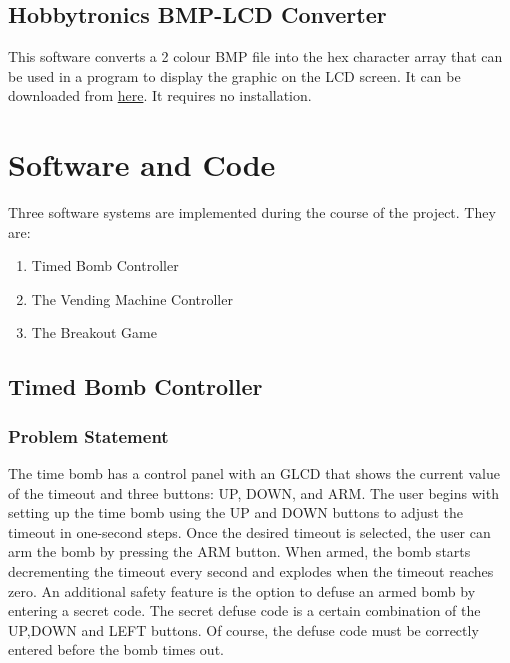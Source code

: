 \documentclass[a4paper,12pt,oneside]{book}
\begin{document}
\section{Hobbytronics BMP-LCD Converter}
\qquad This software converts a 2 colour BMP file into the hex character array that can be used in a program to display the graphic on the LCD screen. It can be downloaded from
\href{http://www.hobbytronics.co.uk/download/BMP-LCD.zip}{here}. It requires no installation.

\chapter{Software and Code}
Three software systems are implemented during the course of the project. They are:
\begin{enumerate}
\item Timed Bomb Controller
\item The Vending Machine Controller
\item The Breakout Game
\end{enumerate}

\section{Timed Bomb Controller}
\subsection{Problem Statement}
\qquad The time bomb has a control panel with an GLCD that shows the current value of the timeout and three buttons: UP, DOWN, and ARM. The user begins with setting up the time bomb using the UP and DOWN buttons to adjust the timeout in one-second steps. Once the desired timeout is selected, the user can arm the bomb by pressing the ARM button. When armed, the bomb starts decrementing the timeout every second and explodes when the timeout reaches zero. An additional safety feature is the option to defuse an armed bomb by entering a secret code. The secret defuse code is a certain combination of the UP,DOWN and LEFT buttons. Of course, the defuse code must be correctly entered before the bomb times out.
\end{document}
